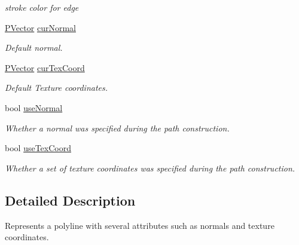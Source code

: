 \begin{DoxyCompactItemize}
\begin{DoxyCompactList}\small\item\em stroke color for edge \end{DoxyCompactList}\item 
\hypertarget{structPPath_ad6cdebaac653dd51a50cde8ef566a42c}{\hyperlink{classcprocessing_1_1PVector}{\-P\-Vector} \hyperlink{structPPath_ad6cdebaac653dd51a50cde8ef566a42c}{cur\-Normal}}\label{structPPath_ad6cdebaac653dd51a50cde8ef566a42c}

\begin{DoxyCompactList}\small\item\em \-Default normal. \end{DoxyCompactList}\item 
\hypertarget{structPPath_a385b5413251b5ab55b5b8ff6da36b2c3}{\hyperlink{classcprocessing_1_1PVector}{\-P\-Vector} \hyperlink{structPPath_a385b5413251b5ab55b5b8ff6da36b2c3}{cur\-Tex\-Coord}}\label{structPPath_a385b5413251b5ab55b5b8ff6da36b2c3}

\begin{DoxyCompactList}\small\item\em \-Default \-Texture coordinates. \end{DoxyCompactList}\item 
\hypertarget{structPPath_ac87e8c7b45a255bef6b26a8d01561d68}{bool \hyperlink{structPPath_ac87e8c7b45a255bef6b26a8d01561d68}{use\-Normal}}\label{structPPath_ac87e8c7b45a255bef6b26a8d01561d68}

\begin{DoxyCompactList}\small\item\em \-Whether a normal was specified during the path construction. \end{DoxyCompactList}\item 
\hypertarget{structPPath_aa6f1ee80b0ac2af7dd7196e5b3f65a96}{bool \hyperlink{structPPath_aa6f1ee80b0ac2af7dd7196e5b3f65a96}{use\-Tex\-Coord}}\label{structPPath_aa6f1ee80b0ac2af7dd7196e5b3f65a96}

\begin{DoxyCompactList}\small\item\em \-Whether a set of texture coordinates was specified during the path construction. \end{DoxyCompactList}\end{DoxyCompactItemize}


\subsection{\-Detailed \-Description}
\-Represents a polyline with several attributes such as normals and texture coordinates. 

